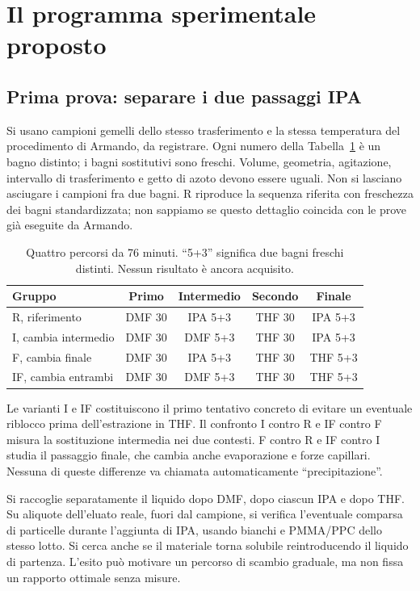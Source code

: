 \documentclass[11pt,reqno]{amsart}
\numberwithin{equation}{section}
\begin{document}
\section{Il programma sperimentale proposto}
\label{sec:experiment}

\subsection{Prima prova: separare i due passaggi IPA}
Si usano campioni gemelli dello stesso trasferimento e la stessa
temperatura del procedimento di Armando, da registrare. Ogni
numero della Tabella~\ref{tab:factorial} \`e un bagno distinto;
i bagni sostitutivi sono freschi. Volume, geometria, agitazione,
intervallo di trasferimento e getto di azoto devono essere
uguali. Non si lasciano asciugare i campioni fra due bagni.
R riproduce la sequenza riferita con freschezza dei bagni
standardizzata; non sappiamo se questo dettaglio coincida con
le prove gi\`a eseguite da Armando.

\begin{table}[htbp]
\caption{Quattro percorsi da 76 minuti. ``5+3'' significa due
bagni freschi distinti. Nessun risultato \`e ancora acquisito.}
\label{tab:factorial}\centering\small
\begin{tabular}{@{}lcccc@{}}\toprule
Gruppo & Primo & Intermedio & Secondo & Finale\\\midrule
R, riferimento &DMF 30&IPA 5+3&THF 30&IPA 5+3\\
I, cambia intermedio &DMF 30&DMF 5+3&THF 30&IPA 5+3\\
F, cambia finale &DMF 30&IPA 5+3&THF 30&THF 5+3\\
IF, cambia entrambi &DMF 30&DMF 5+3&THF 30&THF 5+3\\\bottomrule
\end{tabular}
\end{table}

Le varianti I e IF costituiscono il primo tentativo concreto di
evitare un eventuale riblocco prima dell'estrazione in THF.
Il confronto I contro R e IF contro F misura la sostituzione
intermedia nei due contesti. F contro R e IF contro I studia
il passaggio finale, che cambia anche evaporazione e forze
capillari. Nessuna di queste differenze va chiamata automaticamente
``precipitazione''.

Si raccoglie separatamente il liquido dopo DMF, dopo ciascun IPA
e dopo THF. Su aliquote dell'eluato reale, fuori dal campione,
si verifica l'eventuale comparsa di particelle durante l'aggiunta
di IPA, usando bianchi e PMMA/PPC dello stesso lotto. Si cerca
anche se il materiale torna solubile reintroducendo il liquido
di partenza. L'esito pu\`o motivare un percorso di scambio
graduale, ma non fissa un rapporto ottimale senza misure.
\end{document}
